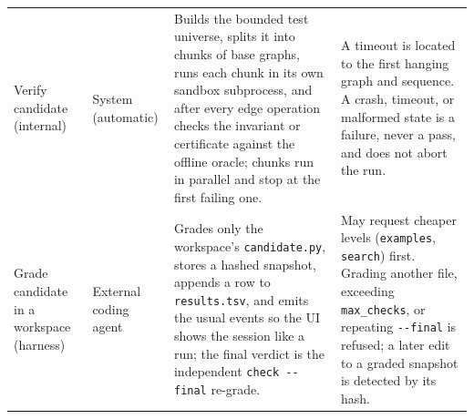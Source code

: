 \begin{center}
\begin{longtable}{@{}>{\raggedright\arraybackslash}p{}>{\raggedright\arraybackslash}p{}>{\raggedright\arraybackslash}p{}>{\raggedright\arraybackslash}p{}@{}}
\addlinespace[2pt]
Verify candidate (internal) & System (automatic) & Builds the bounded test universe, splits it into chunks of base graphs, runs each chunk in its own sandbox subprocess, and after every edge operation checks the invariant or certificate against the offline oracle; chunks run in parallel and stop at the first failing one. & A timeout is located to the first hanging graph and sequence. A crash, timeout, or malformed state is a failure, never a pass, and does not abort the run. \\
\addlinespace[2pt]
Grade candidate in a workspace (harness) & External coding agent & Grades only the workspace's \texttt{candidate.py}, stores a hashed snapshot, appends a row to \texttt{results.tsv}, and emits the usual events so the UI shows the session like a run; the final verdict is the independent \texttt{check -{}-final} re-grade. & May request cheaper levels (\texttt{examples}, \texttt{search}) first. Grading another file, exceeding \texttt{max\_checks}, or repeating \texttt{-{}-final} is refused; a later edit to a graded snapshot is detected by its hash. \\
\bottomrule
\end{longtable}
\end{center}

